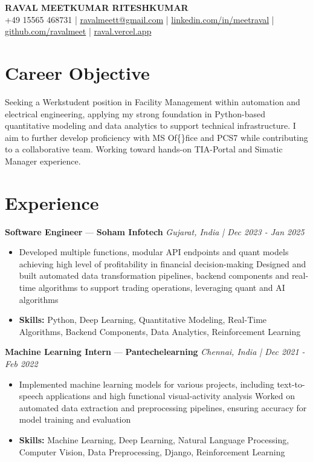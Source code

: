 \documentclass[a4paper,10pt]{article}
\begin{document}
\begin{center}
  {\Large\bfseries RAVAL MEETKUMAR RITESHKUMAR}\\[2pt]
  {\small +49 15565 468731 \;|\; \href{mailto:ravalmeett@gmail.com}{ravalmeett@gmail.com} \;|\; \href{https://www.linkedin.com/in/meetraval/}{linkedin.com/in/meetraval} \;|\; \href{https://github.com/ravalmeet}{github.com/ravalmeet} \;|\; \href{https://raval.vercel.app/}{raval.vercel.app}}
\end{center}
\vspace{-3pt}

\section*{Career Objective}
Seeking a Werkstudent position in Facility Management within automation and electrical engineering, applying my strong foundation in Python-based quantitative modeling and data analytics to support technical infrastructure. I aim to further develop proficiency with MS Of\{\}fice and PCS7 while contributing to a collaborative team. Working toward hands-on TIA-Portal and Simatic Manager experience.\par

\section*{Experience}
\textbf{Software Engineer} — \textbf{Soham Infotech} \hfill \textit{Gujarat, India \;|\; Dec 2023 - Jan 2025}\par
\vspace{1pt}
\begin{itemize}
  \item Developed multiple functions, modular API endpoints and quant models achieving high level of profitability in financial decision-making Designed and built automated data transformation pipelines, backend components and real-time algorithms to support trading operations, leveraging quant and AI algorithms
  \item \textbf{Skills:} Python, Deep Learning, Quantitative Modeling, Real-Time Algorithms, Backend Components, Data Analytics, Reinforcement Learning
\end{itemize}
\vspace{3pt}
\textbf{Machine Learning Intern} — \textbf{Pantechelearning} \hfill \textit{Chennai, India \;|\; Dec 2021 - Feb 2022}\par
\vspace{1pt}
\begin{itemize}
  \item Implemented machine learning models for various projects, including text-to-speech applications and high functional visual-activity analysis Worked on automated data extraction and preprocessing pipelines, ensuring accuracy for model training and evaluation
  \item \textbf{Skills:} Machine Learning, Deep Learning, Natural Language Processing, Computer Vision, Data Preprocessing, Django, Reinforcement Learning
\end{itemize}
\end{document}
